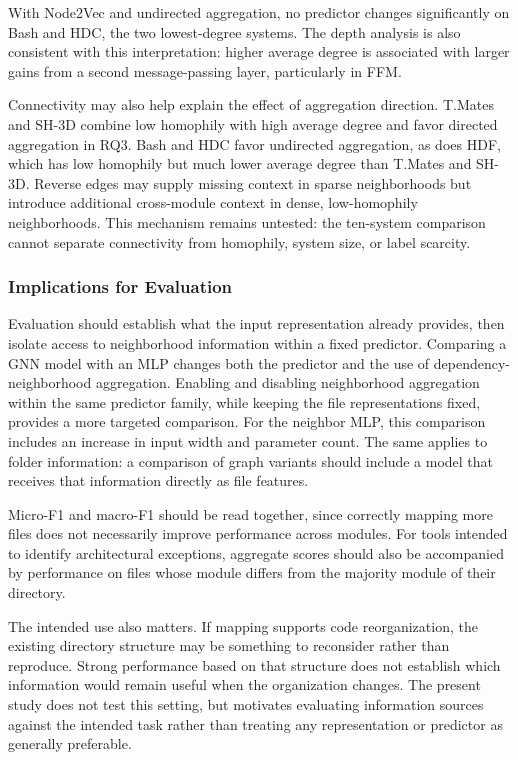 With Node2Vec and undirected aggregation, no predictor changes significantly on Bash and HDC, the two lowest-degree systems. The depth analysis is also consistent with this interpretation: higher average degree is associated with larger gains from a second message-passing layer, particularly in FFM.

Connectivity may also help explain the effect of aggregation direction. T.Mates and SH-3D combine low homophily with high average degree and favor directed aggregation in RQ3. Bash and HDC favor undirected aggregation, as does HDF, which has low homophily but much lower average degree than T.Mates and SH-3D. Reverse edges may supply missing context in sparse neighborhoods but introduce additional cross-module context in dense, low-homophily neighborhoods. This mechanism remains untested: the ten-system comparison cannot separate connectivity from homophily, system size, or label scarcity.

\subsubsection*{Implications for Evaluation}
Evaluation should establish what the input representation already provides, then isolate access to neighborhood information within a fixed predictor. Comparing a GNN model with an MLP changes both the predictor and the use of dependency-neighborhood aggregation. Enabling and disabling neighborhood aggregation within the same predictor family, while keeping the file representations fixed, provides a more targeted comparison. For the neighbor MLP, this comparison includes an increase in input width and parameter count. The same applies to folder information: a comparison of graph variants should include a model that receives that information directly as file features.

Micro-F1 and macro-F1 should be read together, since correctly mapping more files does not necessarily improve performance across modules. For tools intended to identify architectural exceptions, aggregate scores should also be accompanied by performance on files whose module differs from the majority module of their directory.

The intended use also matters. If mapping supports code reorganization, the existing directory structure may be something to reconsider rather than reproduce. Strong performance based on that structure does not establish which information would remain useful when the organization changes. The present study does not test this setting, but motivates evaluating information sources against the intended task rather than treating any representation or predictor as generally preferable.

